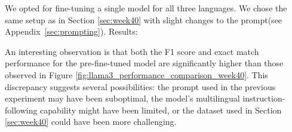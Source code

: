 \documentclass[11pt]{article}
\begin{document}
We opted for fine-tuning a single model for all three languages. We chose the same setup as in Section \ref{sec:week40} with slight changes to the prompt(see Appendix~\vref{sec:prompting}). 
Results:
\begin{table}[ht]
    \centering
    \label{tab:week41_performance_comparison}
\end{table}

An interesting observation is that both the F1 score and exact match performance for the pre-fine-tuned model are significantly higher than those observed in Figure \ref{fig:llama3_performance_comparison_week40}. 
This discrepancy suggests several possibilities: the prompt used in the previous experiment may have been suboptimal, the model's multilingual instruction-following capability might have been limited, or the dataset used in Section \ref{sec:week40} could have been more challenging.

\begin{table}[ht]
    \centering
    \caption{Performance comparison for answerable and unanswerable questions}
    \label{tab:week41_non_answerable_performance}
\end{table}
\end{document}
